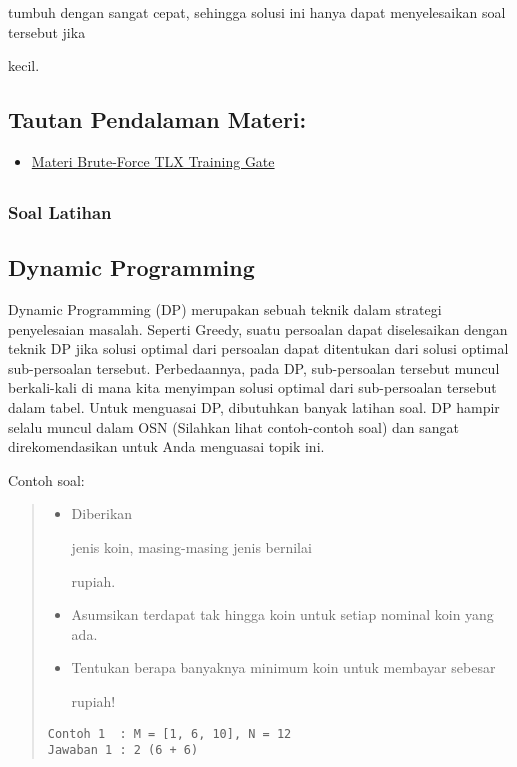 \documentclass[]{article}
\providecommand{\tightlist}{%
  \setlength{\itemsep}{0pt}\setlength{\parskip}{0pt}}
\begin{document}
tumbuh dengan sangat cepat, sehingga solusi ini hanya dapat
menyelesaikan soal tersebut jika

kecil.

\subsection{Tautan Pendalaman Materi:}\label{tautan-pendalaman-materi}

\begin{itemize}
\tightlist
\item
  \href{https://training.ia-toki.org/training/curriculums/1/courses/11/chapters/52/lessons/19/}{Materi
  Brute-Force TLX Training Gate}
\end{itemize}

\subsection{}\label{rekomandasi-soal-soal-latihan}

\subsubsection{Soal Latihan}\label{soal-latihan-1}

\subsection{Dynamic Programming}\label{dynamic-programming}

Dynamic Programming (DP) merupakan sebuah teknik dalam strategi
penyelesaian masalah. Seperti Greedy, suatu persoalan dapat diselesaikan
dengan teknik DP jika solusi optimal dari persoalan dapat ditentukan
dari solusi optimal sub-persoalan tersebut. Perbedaannya, pada DP,
sub-persoalan tersebut muncul berkali-kali di mana kita menyimpan solusi
optimal dari sub-persoalan tersebut dalam tabel. Untuk menguasai DP,
dibutuhkan banyak latihan soal. DP hampir selalu muncul dalam OSN
(Silahkan lihat contoh-contoh soal) dan sangat direkomendasikan untuk
Anda menguasai topik ini.

Contoh soal:

\begin{quote}
\begin{itemize}
\tightlist
\item
  Diberikan

  jenis koin, masing-masing jenis bernilai

  rupiah.
\item
  Asumsikan terdapat tak hingga koin untuk setiap nominal koin yang ada.
\item
  Tentukan berapa banyaknya minimum koin untuk membayar sebesar

  rupiah!
\end{itemize}

\begin{verbatim}
Contoh 1  : M = [1, 6, 10], N = 12
Jawaban 1 : 2 (6 + 6)
\end{verbatim}
\end{quote}
\end{document}

